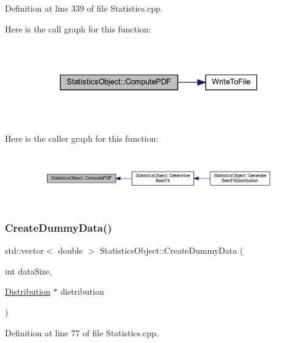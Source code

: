Definition at line 339 of file Statistics.\+cpp.

Here is the call graph for this function\+:
\nopagebreak
\begin{figure}[H]
\begin{center}
\leavevmode
\includegraphics[width=333pt]{class_statistics_object_ad89d69d36051851fe876b1ec28967c1e_cgraph}
\end{center}
\end{figure}
Here is the caller graph for this function\+:
\nopagebreak
\begin{figure}[H]
\begin{center}
\leavevmode
\includegraphics[width=350pt]{class_statistics_object_ad89d69d36051851fe876b1ec28967c1e_icgraph}
\end{center}
\end{figure}
\mbox{\label{class_statistics_object_a8177bcf97b01750d125852b888e11323}} 
\subsubsection{\texorpdfstring{Create\+Dummy\+Data()}{CreateDummyData()}}
{\footnotesize\ttfamily std\+::vector$<$ double $>$ Statistics\+Object\+::\+Create\+Dummy\+Data (\begin{DoxyParamCaption}\item[{int}]{data\+Size,  }\item[{\hyperlink{class_distribution}{Distribution} $\ast$}]{distribution }\end{DoxyParamCaption})}



Definition at line 77 of file Statistics.\+cpp.

